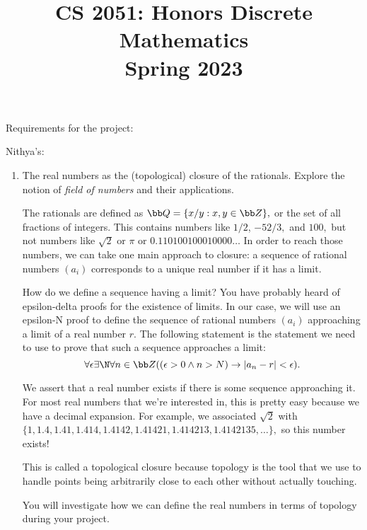 \documentclass{article}
\title{\vspace{-1cm}CS 2051: Honors Discrete Mathematics \\Spring 2023}
\author{}
\date{}
\begin{document}
\maketitle

Requirements for the project:


\bigskip
Nithya's:
\begin{enumerate}[label = \arabic*.]
    \item The real numbers as the (topological) closure of the rationals. Explore the notion of {\it field of numbers} and their applications. 

        The rationals are defined as $\bb Q = \{x/y : x,y\in\bb Z\},$ or the set of all fractions of integers.
        This contains numbers like $1/2$, $-52/3,$ and $100,$ but not numbers like $\sqrt 2$ or $\pi$ or $0.110100100010000\ldots$
        In order to reach those numbers, we can take one main approach to closure: a sequence of rational numbers $(a_i)$ corresponds to a unique real number if it has a limit.

        How do we define a sequence having a limit?
        You have probably heard of epsilon-delta proofs for the existence of limits.
        In our case, we will use an epsilon-N proof to define the sequence of rational numbers $(a_i)$ approaching a limit of a real number $r.$
        The following statement is the statement we need to use to prove that such a sequence approaches a limit:
        $$\forall\epsilon\exists\N\forall n\in\bb Z ((\epsilon>0\land n>N) \to |a_n-r|<\epsilon).$$

        We assert that a real number exists if there is some sequence approaching it.
        For most real numbers that we're interested in, this is pretty easy because we have a decimal expansion.
        For example, we associated $\sqrt 2$ with $\{1,1.4,1.41,1.414,1.4142,1.41421,1.414213,1.4142135,\ldots\},$ so this number exists!

        This is called a topological closure because topology is the tool that we use to handle points being arbitrarily close to each other without actually touching.
        
        You will investigate how we can define the real numbers in terms of topology during your project.


\end{enumerate}
\end{document}
